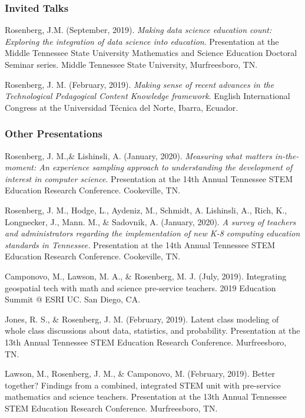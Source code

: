 \documentclass[14,]{article}
\begin{document}
\hypertarget{invited-talks}{%
\subsubsection{Invited Talks}\label{invited-talks}}

Rosenberg, J.M. (September, 2019). \emph{Making data science education
count: Exploring the integration of data science into education}.
Presentation at the Middle Tennessee State University Mathematics and
Science Education Doctoral Seminar series. Middle Tennessee State
University, Murfreesboro, TN.

Rosenberg, J. M. (February, 2019). \emph{Making sense of recent advances
in the Technological Pedagogical Content Knowledge framework}. English
International Congress at the Universidad Técnica del Norte, Ibarra,
Ecuador.

\hypertarget{other-presentations}{%
\subsubsection{Other Presentations}\label{other-presentations}}

Rosenberg, J. M.,\& Lishinsli, A. (January, 2020). \emph{Measuring what
matters in-the-moment: An experience sampling approach to understanding
the development of interest in computer science}. Presentation at the
14th Annual Tennessee STEM Education Research Conference. Cookeville,
TN.

Rosenberg, J. M., Hodge, L., Aydeniz, M., Schmidt, A. Lishinsli, A.,
Rich, K., Longnecker, J., Mann. M., \& Sadovnik, A. (January, 2020).
\emph{A survey of teachers and administrators regarding the
implementation of new K-8 computing education standards in Tennessee.}
Presentation at the 14th Annual Tennessee STEM Education Research
Conference. Cookeville, TN.

Camponovo, M., Lawson, M. A., \& Rosenberg, M. J. (July, 2019).
Integrating geospatial tech with math and science pre-service teachers.
2019 Education Summit @ ESRI UC. San Diego, CA.

Jones, R. S., \& Rosenberg, J. M. (February, 2019). Latent class
modeling of whole class discussions about data, statistics, and
probability. Presentation at the 13th Annual Tennessee STEM Education
Research Conference. Murfreesboro, TN.

Lawson, M., Rosenberg, J. M., \& Camponovo, M. (February, 2019). Better
together? Findings from a combined, integrated STEM unit with
pre-service mathematics and science teachers. Presentation at the 13th
Annual Tennessee STEM Education Research Conference. Murfreesboro, TN.
\end{document}
